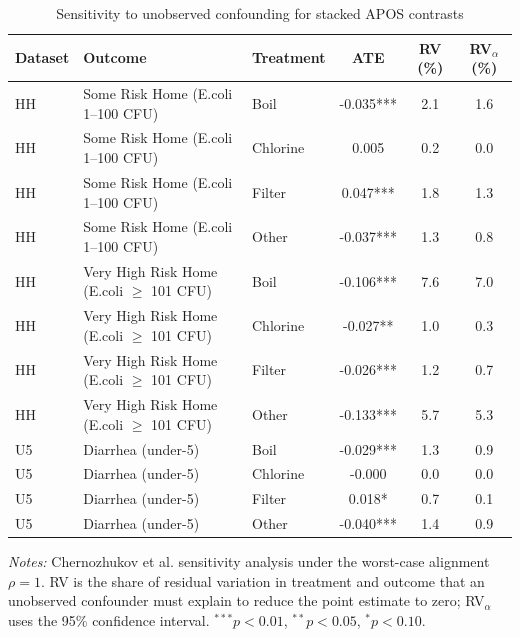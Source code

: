 \begin{table}[htbp]
\centering
\caption{Sensitivity to unobserved confounding for stacked APOS contrasts}
\label{tab:sensitivity-apos}
\small\setlength{\tabcolsep}{6pt}
\begin{tabular}{lllccc}
\toprule
Dataset & Outcome & Treatment & ATE & RV (\%) & RV$_\alpha$ (\%) \\
\midrule
HH & Some Risk Home (E.coli 1--100 CFU) & Boil & -0.035*** & 2.1 & 1.6 \\
HH & Some Risk Home (E.coli 1--100 CFU) & Chlorine & 0.005 & 0.2 & 0.0 \\
HH & Some Risk Home (E.coli 1--100 CFU) & Filter & 0.047*** & 1.8 & 1.3 \\
HH & Some Risk Home (E.coli 1--100 CFU) & Other & -0.037*** & 1.3 & 0.8 \\
HH & Very High Risk Home (E.coli $\geq$ 101 CFU) & Boil & -0.106*** & 7.6 & 7.0 \\
HH & Very High Risk Home (E.coli $\geq$ 101 CFU) & Chlorine & -0.027** & 1.0 & 0.3 \\
HH & Very High Risk Home (E.coli $\geq$ 101 CFU) & Filter & -0.026*** & 1.2 & 0.7 \\
HH & Very High Risk Home (E.coli $\geq$ 101 CFU) & Other & -0.133*** & 5.7 & 5.3 \\
U5 & Diarrhea (under-5) & Boil & -0.029*** & 1.3 & 0.9 \\
U5 & Diarrhea (under-5) & Chlorine & -0.000 & 0.0 & 0.0 \\
U5 & Diarrhea (under-5) & Filter & 0.018* & 0.7 & 0.1 \\
U5 & Diarrhea (under-5) & Other & -0.040*** & 1.4 & 0.9 \\
\bottomrule
\end{tabular}
\par\vspace{3pt}
\begin{minipage}{\linewidth}\footnotesize \textit{Notes:} Chernozhukov et al. sensitivity analysis under the worst-case alignment $\rho=1$. RV is the share of residual variation in treatment and outcome that an unobserved confounder must explain to reduce the point estimate to zero; RV$_\alpha$ uses the 95\% confidence interval. $^{***}p<0.01$, $^{**}p<0.05$, $^{*}p<0.10$.\end{minipage}
\end{table}
